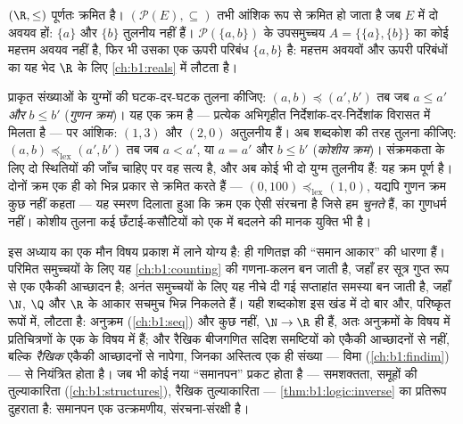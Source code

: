 \begin{example}\label{ex:b1:logic:orders}
$(\R, \leq)$ पूर्णतः क्रमित है। $(\mathcal{P}(E), \subseteq)$ तभी आंशिक रूप
से क्रमित हो जाता है जब $E$ में दो अवयव हों: $\{a\}$ और $\{b\}$ तुलनीय नहीं
हैं। $\mathcal{P}(\{a,b\})$ के उपसमुच्चय $A = \{\{a\}, \{b\}\}$ का कोई
महत्तम अवयव नहीं है, फिर भी उसका एक ऊपरी परिबंध $\{a, b\}$ है: महत्तम अवयवों
और ऊपरी परिबंधों का यह भेद $\R$ के लिए \cref{ch:b1:reals} में लौटता है।
\end{example}

\begin{example}[जाली $\N^2$ पर दो क्रम]\label{ex:b1:logic:lexorder}
प्राकृत संख्याओं के युग्मों की घटक-दर-घटक तुलना कीजिए: $(a, b) \preceq (a',
b')$ तब जब $a \leq a'$ \emph{और} $b \leq b'$ (\emph{गुणन क्रम})। यह एक क्रम
है --- प्रत्येक अभिगृहीत निर्देशांक-दर-निर्देशांक विरासत में मिलता है --- पर
आंशिक: $(1, 3)$ और $(2, 0)$ अतुलनीय हैं। अब शब्दकोश की तरह तुलना कीजिए: $(a,
b) \preceq_{\mathrm{lex}} (a', b')$ तब जब $a < a'$, या $a = a'$ और $b \leq
b'$ (\emph{कोशीय क्रम})। संक्रमकता के लिए दो स्थितियों की जाँच चाहिए पर वह
सत्य है, और अब कोई भी दो युग्म तुलनीय हैं: यह क्रम पूर्ण है। दोनों क्रम एक
ही  को भिन्न प्रकार से क्रमित करते हैं --- $(0, 100)
\preceq_{\mathrm{lex}} (1, 0)$, यद्यपि गुणन क्रम कुछ नहीं कहता --- यह स्मरण
दिलाता हुआ कि क्रम एक ऐसी संरचना है जिसे हम \emph{चुनते} हैं,  का
गुणधर्म नहीं। कोशीय तुलना कई छँटाई-कसौटियों को एक में बदलने की मानक युक्ति
भी है।
\end{example}

\begin{remark}[मध्यांतर: आकार माने एकैकी आच्छादन]\label{rem:b1:logic:interlude}
इस अध्याय का एक मौन विषय प्रकाश में लाने योग्य है:  
ही गणितज्ञ की ``समान आकार'' की धारणा हैं। परिमित समुच्चयों के लिए यह
\cref{ch:b1:counting} की गणना-कलन बन जाती है, जहाँ हर सूत्र गुप्त रूप से एक
एकैकी आच्छादन है; अनंत समुच्चयों के लिए यह नीचे दी गई सप्ताहांत समस्या बन
जाती है, जहाँ $\N$, $\Q$ और $\R$ के आकार सचमुच भिन्न निकलते हैं। यही शब्दकोश
इस खंड में दो बार और, परिष्कृत रूपों में, लौटता है: अनुक्रम
(\cref{ch:b1:seq}) और कुछ नहीं,  $\N \to \R$ ही हैं, अतः
अनुक्रमों के विषय में  प्रतिचित्रणों के एक  के विषय में  हैं;
और रैखिक बीजगणित सदिश समष्टियों को एकैकी आच्छादनों से नहीं, बल्कि
\emph{रैखिक} एकैकी आच्छादनों से नापेगा, जिनका अस्तित्व एक ही संख्या --- विमा
(\cref{ch:b1:findim}) --- से नियंत्रित होता है। जब भी कोई नया ``समानपन''
प्रकट होता है --- समशक्तता, समूहों की तुल्याकारिता
(\cref{ch:b1:structures}), रैखिक तुल्याकारिता ---
\cref{thm:b1:logic:inverse} का प्रतिरूप दुहराता है: समानपन एक उत्क्रमणीय,
संरचना-संरक्षी  है।
\end{remark}

